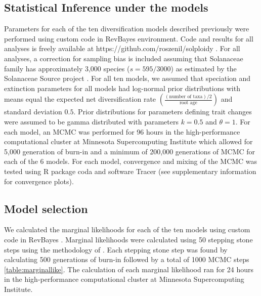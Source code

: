 \subsection{Statistical Inference under the models}

Parameters for each of the ten diversification models described previously were performed using custom code in RevBayes \citep{hoehna_2016} environment. Code and results for all analyses is freely available at https://github.com/roszenil/solploidy . For all analyses, a correction for sampling bias is included assuming that Solanaceae family has approximately 3,000 species ($s=595/3000$) as estimated by the Solanaceae Source project \citep{solsource}. For all ten models, we assumed that speciation and extinction parameters for all models  had log-normal prior distributions with means equal the expected net diversification rate $ ( \frac{(\textrm{number of taxa})/2}{\textrm{root age}})$ and standard deviation $0.5$.
Prior distributions for parameters defining trait changes were  assumed to be gamma distributed with parameters $k=0.5$ and $\theta=1$. 
For each model, an MCMC was performed for 96 hours in the high-performance computational cluster at Minnesota Supercomputing Institute which allowed for 5,000 generation of burn-in and a minimum of 200,000 generations of MCMC for each of the 6 models. For each model, convergence and mixing of the MCMC was tested using R package coda and software Tracer (see supplementary information for convergence plots).

\subsection{Model selection}

We calculated the marginal likelihoods  for each of the ten models using custom code in RevBayes \citet{hoehna_2016}.  Marginal likelihoods were calculated using 50  stepping stone steps using the methodology of \citet{xie_2010}. Each stepping stone step was found by calculating 500 generations of burn-in followed by a total of 1000 MCMC steps \cref{table:marginallike}.  The calculation of each marginal likelihood ran for 24 hours in the high-performance computational cluster at Minnesota Supercomputing Institute.\newline

